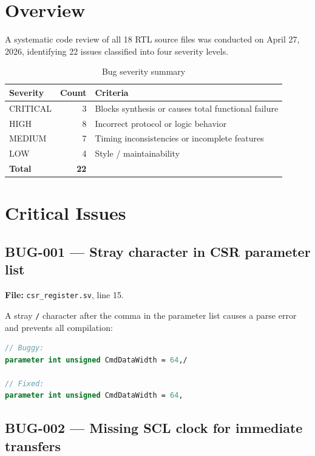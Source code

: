\documentclass[12pt, a4paper, oneside]{report}
\newcommand{\file}[1]{\texttt{#1}}
\begin{document}
\section{Overview}

A systematic code review of all 18 RTL source files was conducted on April 27, 2026,
identifying 22 issues classified into four severity levels.

\begin{table}[H]
\centering
\caption{Bug severity summary}
\label{tab:bug_summary}
\begin{tabular}{lrl}
\toprule
\textbf{Severity} & \textbf{Count} & \textbf{Criteria} \\
\midrule
CRITICAL & 3 & Blocks synthesis or causes total functional failure \\
HIGH     & 8 & Incorrect protocol or logic behavior \\
MEDIUM   & 7 & Timing inconsistencies or incomplete features \\
LOW      & 4 & Style / maintainability \\
\midrule
\textbf{Total} & \textbf{22} & \\
\bottomrule
\end{tabular}
\end{table}

\section{Critical Issues}

\subsection*{BUG-001 --- Stray character in CSR parameter list}

\textbf{File:} \file{csr\_register.sv}, line 15.

A stray \texttt{/} character after the comma in the parameter list causes a parse
error and prevents all compilation:

\begin{lstlisting}[language=SystemVerilog]
// Buggy:
parameter int unsigned CmdDataWidth = 64,/

// Fixed:
parameter int unsigned CmdDataWidth = 64,
\end{lstlisting}

\subsection*{BUG-002 --- Missing SCL clock for immediate transfers}
\end{document}
